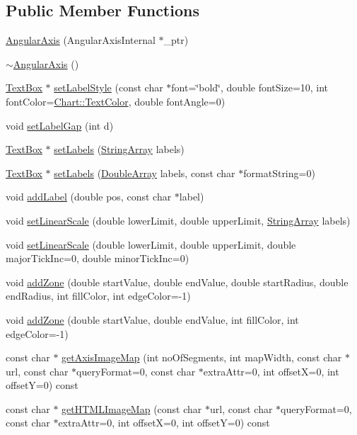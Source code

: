 \subsection*{Public Member Functions}
\begin{DoxyCompactItemize}
\item 
\hyperlink{class_angular_axis_a5ea5e1163079a9decf8323a232d4210a}{Angular\+Axis} (Angular\+Axis\+Internal $\ast$\+\_\+ptr)
\item 
\hyperlink{class_angular_axis_a72ea8b4c42e00cddd9f1bfabd0bcae8c}{$\sim$\+Angular\+Axis} ()
\item 
\hyperlink{class_text_box}{Text\+Box} $\ast$ \hyperlink{class_angular_axis_a7cdca2dfe1200fdf2664d269dac585ba}{set\+Label\+Style} (const char $\ast$font=\char`\"{}bold\char`\"{}, double font\+Size=10, int font\+Color=\hyperlink{namespace_chart_abee0d882fdc9ad0b001245ad9fc64011a879e14f2f5024caccc047374342321ef}{Chart\+::\+Text\+Color}, double font\+Angle=0)
\item 
void \hyperlink{class_angular_axis_ae305f4e4b0d300b6b8e63a0f2645368c}{set\+Label\+Gap} (int d)
\item 
\hyperlink{class_text_box}{Text\+Box} $\ast$ \hyperlink{class_angular_axis_ae02899ce7abec02a96477811bd22c27e}{set\+Labels} (\hyperlink{class_string_array}{String\+Array} labels)
\item 
\hyperlink{class_text_box}{Text\+Box} $\ast$ \hyperlink{class_angular_axis_a3046d7450d5b1f01c00ae03668597bfb}{set\+Labels} (\hyperlink{class_double_array}{Double\+Array} labels, const char $\ast$format\+String=0)
\item 
void \hyperlink{class_angular_axis_a6f255a756fc6e9e19096618f9e34873f}{add\+Label} (double pos, const char $\ast$label)
\item 
void \hyperlink{class_angular_axis_a11fd9c97d2d76f01cec095a10edbe500}{set\+Linear\+Scale} (double lower\+Limit, double upper\+Limit, \hyperlink{class_string_array}{String\+Array} labels)
\item 
void \hyperlink{class_angular_axis_a69bb45da8256fc6999eb4a7fe789ee10}{set\+Linear\+Scale} (double lower\+Limit, double upper\+Limit, double major\+Tick\+Inc=0, double minor\+Tick\+Inc=0)
\item 
void \hyperlink{class_angular_axis_a0e99a07d920a902b3fa57e8a3c272004}{add\+Zone} (double start\+Value, double end\+Value, double start\+Radius, double end\+Radius, int fill\+Color, int edge\+Color=-\/1)
\item 
void \hyperlink{class_angular_axis_a53f7a154799715aa97d16d5140a7de17}{add\+Zone} (double start\+Value, double end\+Value, int fill\+Color, int edge\+Color=-\/1)
\item 
const char $\ast$ \hyperlink{class_angular_axis_a6d9609544b763a5af1f6eb4e24165ea6}{get\+Axis\+Image\+Map} (int no\+Of\+Segments, int map\+Width, const char $\ast$url, const char $\ast$query\+Format=0, const char $\ast$extra\+Attr=0, int offsetX=0, int offsetY=0) const
\item 
const char $\ast$ \hyperlink{class_angular_axis_ad7ee19adef39f7ce7fb1ce5bf2941b0d}{get\+H\+T\+M\+L\+Image\+Map} (const char $\ast$url, const char $\ast$query\+Format=0, const char $\ast$extra\+Attr=0, int offsetX=0, int offsetY=0) const
\end{DoxyCompactItemize}
